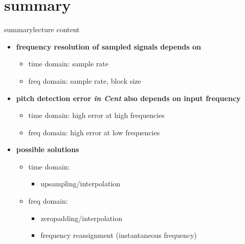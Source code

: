   \section[summary]{summary}
        \begin{frame}{summary}{lecture content}
            \begin{itemize}
                \item   \textbf{frequency resolution of sampled signals depends on}
                    \begin{itemize}
                        \item   time domain: sample rate
                        \item   freq domain: sample rate, block size
                    \end{itemize}
                \bigskip
                \item   \textbf{pitch detection error \textsl{in Cent} also depends on input frequency}
                    \begin{itemize}
                        \item   time domain: high error at high frequencies
                        \item   freq domain: high error at low frequencies
                    \end{itemize}
                \bigskip
                \item   \textbf{possible solutions}
                    \begin{itemize}
                        \item   time domain: 
                            \begin{itemize}
                                \item upsampling/interpolation
                            \end{itemize}
                        \item   freq domain: 
                            \begin{itemize}
                                \item   zeropadding/interpolation
                                \item   frequency reassignment (instantaneous frequency)
                            \end{itemize}
                    \end{itemize}
            \end{itemize}
        \end{frame}

